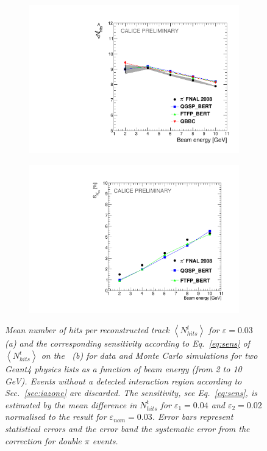 \begin{figure}
	\centering
	\begin{subfigure}{0.5\textwidth}
		\centering
		\includegraphics[width=.90\linewidth]{ECAL/plots/number-graph.pdf}
		\caption{\label{fig:trackshitsgraph}}
	\end{subfigure}%
	\begin{subfigure}{0.5\textwidth}
		\centering
		\includegraphics[width=.90\linewidth]{ECAL/plots/delta-number-graph.pdf}
		\caption{\label{fig:dtrackshitsgraph}}
	\end{subfigure}
	\caption{\label{fig:fulltrackhitsgraph} \sl Mean number of hits per reconstructed track  $\left<N_{hits}^t\right>$ for $\varepsilon = 0.03$  (a) and the corresponding sensitivity according to Eq.~\ref{eq:sens} of  $\left<N_{hits}^t\right>$ on the \ep\, (b) for data and Monte Carlo simulations for two {\sc Geant}4 physics lists as a function of beam energy (from 2 to 10\,GeV). Events without a detected interaction region according to Sec.~\ref{sec:iazone} are discarded. The sensitivity, see Eq.~\ref{eq:sens}, is estimated by the mean difference in $N_{hits}^t$ for $\varepsilon_1 = 0.04$ and $\varepsilon_2 = 0.02$ normalised to the result for $\varepsilon_{nom} = 0.03$. Error bars represent statistical errors and the error band the systematic error from the correction for double $\pi$ events.}
\end{figure}


